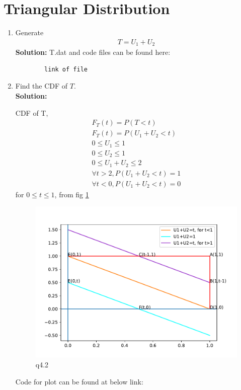 \documentclass[journal,12pt,twocolumn]{IEEEtran}
\renewcommand\thesection{\arabic{section}}
\theoremstyle{remark}
\newcommand{\solution}{\noindent \textbf{Solution: }}
\numberwithin{equation}{section}
\begin{document}
\section{Triangular Distribution}
\begin{enumerate}[label=\thesection.\arabic*
,ref=\thesection.\theenumi]
%
\item Generate 
	\begin{align}
		T = U_1+U_2
	\end{align}
	\solution 
	T.dat and code files can be found here:
	\begin{lstlisting}
		link of file
	\end{lstlisting}
\item Find the CDF of $T$. \\
\solution

CDF of T, 
\begin{align}
	F_T(t) = P(T<t) \\
	F_T(t) = P(U_1+U_2<t) \\
	0 \leq U_1 \leq 1 \\
	0 \leq U_2 \leq 1 \\
	0 \leq U_1 + U_2 \leq 2 \\
	\forall t>2, P(U_1+U_2<t) = 1 \\
	\forall t<0, P(U_1+U_2<t) = 0 
\end{align}
for $0 \leq t \leq 1$,
from fig \ref*{fig:q4_2}
\begin{figure}[h]
	\centering
	\includegraphics[width=\columnwidth]{figs/4/q4_2.pdf}
	 \caption{q4.2}
	\label{fig:q4_2}    
\end{figure}
Code for plot can be found at below link:

\end{enumerate}
\end{document}

